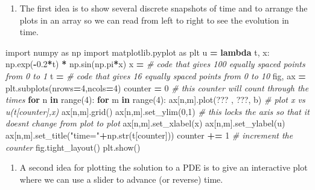 \documentclass[
]{book}
\newenvironment{Shaded}{\begin{snugshade}}{\end{snugshade}}
\newcommand{\BuiltInTok}[1]{#1}
\newcommand{\CommentTok}[1]{\textcolor[rgb]{0.56,0.35,0.01}{\textit{#1}}}
\newcommand{\ControlFlowTok}[1]{\textcolor[rgb]{0.13,0.29,0.53}{\textbf{#1}}}
\newcommand{\DecValTok}[1]{\textcolor[rgb]{0.00,0.00,0.81}{#1}}
\newcommand{\FloatTok}[1]{\textcolor[rgb]{0.00,0.00,0.81}{#1}}
\newcommand{\ImportTok}[1]{#1}
\newcommand{\KeywordTok}[1]{\textcolor[rgb]{0.13,0.29,0.53}{\textbf{#1}}}
\newcommand{\NormalTok}[1]{#1}
\newcommand{\OperatorTok}[1]{\textcolor[rgb]{0.81,0.36,0.00}{\textbf{#1}}}
\newcommand{\StringTok}[1]{\textcolor[rgb]{0.31,0.60,0.02}{#1}}
\providecommand{\tightlist}{%
  \setlength{\itemsep}{0pt}\setlength{\parskip}{0pt}}
\theoremstyle{definition}
\theoremstyle{definition}
\theoremstyle{definition}
\theoremstyle{remark}
\begin{document}
\begin{enumerate}
\def\labelenumi{\alph{enumi}.}
\tightlist
\item
  The first idea is to show several discrete snapshots of time and to arrange the plots in an array so we can read from left to right to see the evolution in time.
\end{enumerate}

\begin{Shaded}
\begin{Highlighting}[]
\ImportTok{import}\NormalTok{ numpy }\ImportTok{as}\NormalTok{ np}
\ImportTok{import}\NormalTok{ matplotlib.pyplot }\ImportTok{as}\NormalTok{ plt}
\NormalTok{u }\OperatorTok{=} \KeywordTok{lambda}\NormalTok{ t, x: np.exp(}\OperatorTok{{-}}\FloatTok{0.2}\OperatorTok{*}\NormalTok{t) }\OperatorTok{*}\NormalTok{ np.sin(np.pi}\OperatorTok{*}\NormalTok{x)}
\NormalTok{x }\OperatorTok{=} \CommentTok{\# code that gives 100 equally spaced points from 0 to 1 }
\NormalTok{t }\OperatorTok{=} \CommentTok{\# code that gives 16 equally spaced points from 0 to 10}
\NormalTok{fig, ax }\OperatorTok{=}\NormalTok{ plt.subplots(nrows}\OperatorTok{=}\DecValTok{4}\NormalTok{,ncols}\OperatorTok{=}\DecValTok{4}\NormalTok{)}
\NormalTok{counter }\OperatorTok{=} \DecValTok{0} \CommentTok{\# this counter will count through the times}
\ControlFlowTok{for}\NormalTok{ n }\KeywordTok{in} \BuiltInTok{range}\NormalTok{(}\DecValTok{4}\NormalTok{):}
    \ControlFlowTok{for}\NormalTok{ m }\KeywordTok{in} \BuiltInTok{range}\NormalTok{(}\DecValTok{4}\NormalTok{):}
\NormalTok{        ax[n,m].plot(??? , ???, }\StringTok{\textquotesingle{}b\textquotesingle{}}\NormalTok{) }\CommentTok{\# plot x vs u(t[counter],x)}
\NormalTok{        ax[n,m].grid()}
\NormalTok{        ax[n,m].set\_ylim(}\DecValTok{0}\NormalTok{,}\DecValTok{1}\NormalTok{) }\CommentTok{\# this locks the axis so that it doesn\textquotesingle{}t change from plot to plot}
\NormalTok{        ax[n,m].set\_xlabel(}\StringTok{\textquotesingle{}x\textquotesingle{}}\NormalTok{)}
\NormalTok{        ax[n,m].set\_ylabel(}\StringTok{\textquotesingle{}u\textquotesingle{}}\NormalTok{)}
\NormalTok{        ax[n,m].set\_title(}\StringTok{"time="}\OperatorTok{+}\NormalTok{np.}\BuiltInTok{str}\NormalTok{(t[counter]))}
\NormalTok{        counter }\OperatorTok{+=} \DecValTok{1} \CommentTok{\# increment the counter}
\NormalTok{fig.tight\_layout()        }
\NormalTok{plt.show()}
\end{Highlighting}
\end{Shaded}

\begin{enumerate}
\def\labelenumi{\alph{enumi}.}
\setcounter{enumi}{1}
\tightlist
\item
  A second idea for plotting the solution to a PDE is to give an interactive plot where we can use a slider to advance (or reverse) time.
\end{enumerate}
\end{document}
